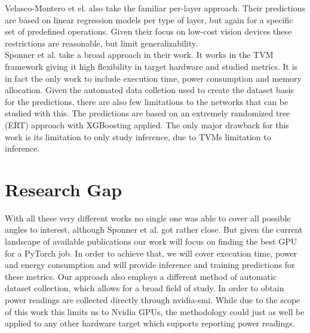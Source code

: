 Velasco-Montero et el. also take the familiar per-layer approach. Their predictions are based on linear
regression models per type of layer, but again for a specific set of predefined operations. Given their 
focus on low-cost vision devices these restrictions are reasonable, but limit generalizability. \\
Sponner et al. take a broad approach in their work. It works in the TVM framework giving it high flexibility
in target hardware and studied metrics. It is in fact the only work to include execution time, power
consumption and memory allocation. Given the automated data colletion used to create the dataset basis
for the predictions, there are also few limitations to the networks that can be studied with this. 
The predictions are based on an extremely randomized tree (ERT) approach with XGBoosting applied. The 
only major drawback for this work is its limitation to only study inference, due to TVMs limitation to inference.



\section{Research Gap}
With all these very different works no single one was able to cover all possible angles to interest,
although Sponner et al. got rather close. But given the current landscape of available publications
our work will focus on finding the best GPU for a PyTorch job. In order to achieve that, we will cover
execution time, power and energy consumption and will provide inference and training predictions for these
metrics. Our approach also employs a different method of automatic dataset collection, which allows
for a broad field of study. In order to obtain power readings are collected directly through nvidia-smi.
While due to the scope of this work this limits us to Nvidia GPUs, the methodology could just as well be 
applied to any other hardware target which supports reporting power readings.

